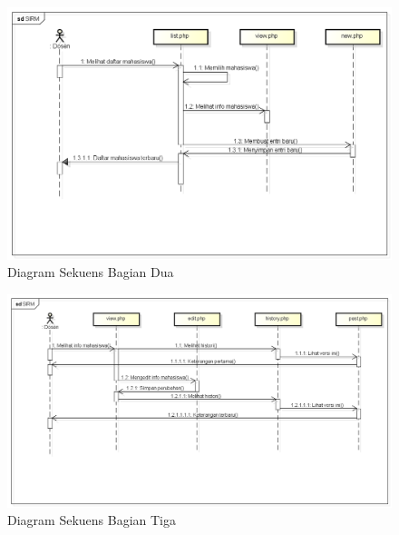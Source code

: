 \begin{figure}[H]
\centering
\includegraphics[scale=0.5]{Gambar/sekuenslist.png}
\caption[Diagram Sekuens Bagian Dua]{Diagram Sekuens Bagian Dua} 
\label{fig:ds2}
\end{figure}

\begin{figure}[H]
\centering
\includegraphics[scale=0.4]{Gambar/sekuensview.png}
\caption[Diagram Sekuens Bagian Tiga]{Diagram Sekuens Bagian Tiga} 
\label{fig:ds3}
\end{figure}